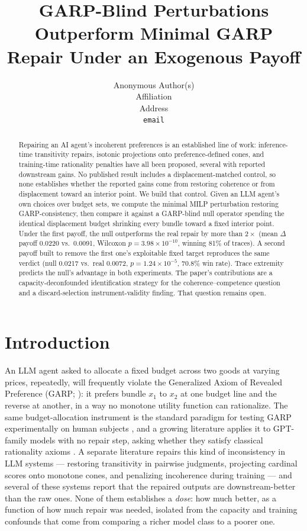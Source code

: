 \documentclass{article}
\title{GARP-Blind Perturbations Outperform Minimal GARP Repair Under an Exogenous Payoff}
\author{%
  Anonymous Author(s) \\
  Affiliation \\
  Address \\
  \texttt{email} \\
}
\begin{document}
\maketitle

\begin{abstract}
Repairing an AI agent's incoherent preferences is an established line of work: inference-time
transitivity repairs, isotonic projections onto preference-defined cones, and training-time
rationality penalties have all been proposed, several with reported downstream gains. No published
result includes a displacement-matched control, so none establishes whether the reported gains come
from restoring coherence or from displacement toward an interior point. We build that control.
Given an LLM agent's own choices over budget sets, we compute the minimal MILP perturbation
restoring GARP-consistency, then compare it against a GARP-blind null operator spending the
identical displacement budget shrinking every bundle toward a fixed interior point. Under the first
payoff, the null outperforms the real repair by more than $2\times$ (mean $\Delta$payoff 0.0220
vs.\ 0.0091, Wilcoxon $p=3.98\times10^{-10}$, winning 81\% of traces). A second payoff built to
remove the first one's exploitable fixed target reproduces the same verdict (null 0.0217 vs.\ real
0.0072, $p=1.24\times10^{-5}$, 70.8\% win rate). Trace extremity predicts the null's advantage in
both experiments. The paper's contributions are a capacity-deconfounded identification strategy
for the coherence--competence question and a discard-selection instrument-validity finding. That
question remains open.
\end{abstract}

\section{Introduction}
\label{sec:intro}

An LLM agent asked to allocate a fixed budget across two goods at varying prices, repeatedly,
will frequently violate the Generalized Axiom of Revealed Preference (GARP;
\citealp{afriat1967construction,varian1982nonparametric}): it prefers bundle
$x_1$ to $x_2$ at one budget line and the reverse at another, in a way no monotone utility
function can rationalize. The same budget-allocation instrument is the standard paradigm for
testing GARP experimentally on human subjects \citep{andreoni2002giving,choi2007consistency,
choi2014rational}, and a growing literature applies it to GPT-family models with no repair step,
asking whether they satisfy classical rationality axioms
\citep{chen2023emergence}. A separate literature repairs this kind of inconsistency in LLM
systems --- restoring transitivity in pairwise judgments, projecting cardinal scores onto
monotone cones, and penalizing incoherence during training --- and several of these systems report
that the repaired outputs are downstream-better than the raw ones. None of them establishes
a \emph{dose}: how much better, as a function of how much repair was needed, isolated from the
capacity and training confounds that come from comparing a richer model class to a poorer one.
\end{document}
